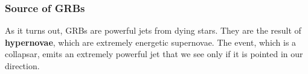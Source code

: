 \documentclass{article}
\begin{document}
	\subsubsection{Source of GRBs}
	As it turns out, GRBs are powerful jets from dying stars. They are the result of \textbf{hypernovae}, which are extremely energetic supernovae. The event, which is a collapsar, emits an extremely powerful jet that we see only if it is pointed in our direction.
\end{document}

